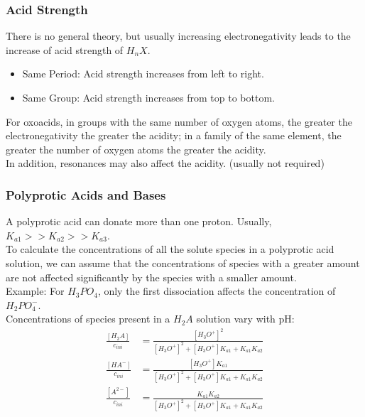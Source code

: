 \documentclass[aspectratio=169]{beamer}
\def\blankline{\\[12pt]}
\begin{document}
\begin{frame}
  \frametitle{Acid Strength}
  There is no general theory, but usually increasing electronegativity 
  leads to the increase of acid strength of $H_nX$. 
  \begin{itemize}
    \item Same Period: Acid strength increases from left to right.
    \item Same Group: Acid strength increases from top to bottom. 
  \end{itemize}
  For oxoacids, in groups with the same number of oxygen atoms, the greater the electronegativity the greater the acidity;
  in a family of the same element, the greater the number of oxygen atoms the greater the acidity. 
  \blankline
  In addition, resonances may also affect the acidity. (usually not required)
\end{frame}
\begin{frame}
  \frametitle{Polyprotic Acids and Bases}
  A polyprotic acid can donate more than one proton. Usually, $K_{a1} >> K_{a2} >> K_{a3}$. 
  \blankline
  To calculate the concentrations of all the solute species in a polyprotic acid solution, we can assume 
  that the concentrations of species with a greater amount are not affected significantly by the species with a smaller amount.
  \\
  Example: For $H_3PO_4$, only the first dissociation affects the concentration of $H_2PO_4^{-}$. 
  \blankline
  Concentrations of species present in a $H_2A$ solution vary with pH:
  \begin{align*}
    \frac{[H_2A]}{c_{ini}} &= \frac{[H_3O^+]^2}{[H_3O^+]^2 + [H_3O^+]K_{a1} + K_{a1}K_{a2}} \\
    \frac{[HA^-]}{c_{ini}} &= \frac{[H_3O^+]K_{a1}}{[H_3O^+]^2 + [H_3O^+]K_{a1} + K_{a1}K_{a2}} \\
    \frac{[A^{2-}]}{c_{ini}} &= \frac{K_{a1}K_{a2}}{[H_3O^+]^2 + [H_3O^+]K_{a1} + K_{a1}K_{a2}}
  \end{align*}
\end{frame}
\end{document}
